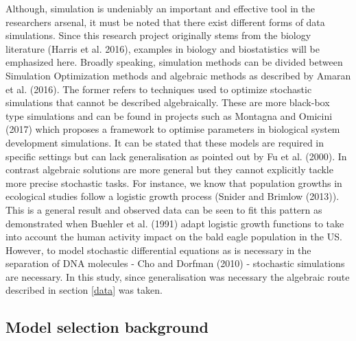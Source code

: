 \documentclass[12pt,]{article}
\begin{document}
Although, simulation is undeniably an important and effective tool in the researchers arsenal, it must be noted that there exist different forms of data simulations. Since this research project originally stems from the biology literature (Harris et al. 2016), examples in biology and biostatistics will be emphasized here. Broadly speaking, simulation methods can be divided between Simulation Optimization methods and algebraic methods as described by Amaran et al. (2016). The former refers to techniques used to optimize stochastic simulations that cannot be described algebraically. These are more black-box type simulations and can be found in projects such as Montagna and Omicini (2017) which proposes a framework to optimise parameters in biological system development simulations. It can be stated that these models are required in specific settings but can lack generalisation as pointed out by Fu et al. (2000). In contrast algebraic solutions are more general but they cannot explicitly tackle more precise stochastic tasks. For instance, we know that population growths in ecological studies follow a logistic growth process (Snider and Brimlow (2013)). This is a general result and observed data can be seen to fit this pattern as demonstrated when Buehler et al. (1991) adapt logistic growth functions to take into account the human activity impact on the bald eagle population in the US. However, to model stochastic differential equations as is necessary in the separation of DNA molecules - Cho and Dorfman (2010) - stochastic simulations are necessary. In this study, since generalisation was necessary the algebraic route described in section \ref{data} was taken.

\hypertarget{model-selection-background}{%
\subsection{Model selection background}\label{model-selection-background}}
\end{document}
